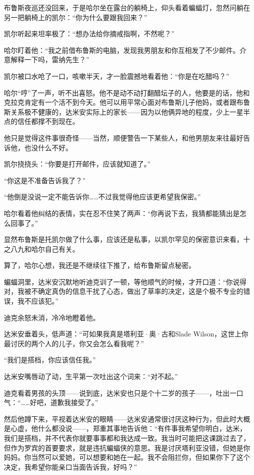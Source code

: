 \documentclass[../main]{subfiles}
\begin{document}
布鲁斯夜巡还没回来，于是哈尔坐在露台的躺椅上，仰头看着蝙蝠灯，忽然问躺在另一把躺椅上的凯尔：“你为什么要跟我回来？”

凯尔听起来坦率极了：“想办法给你摘戒指啊，不然呢？”

哈尔盯着他：“我之前借布鲁斯的电脑，发现我男朋友和你互相发了不少邮件。介意解释一下吗，雷纳先生？”

凯尔被口水呛了一口，咳嗽半天，才一脸震撼地看着他：“你是在吃醋吗？”

哈尔“哼”了一声，听不出喜怒。他不是动不动打翻醋坛子的人，他要是的话，他和克拉克肯定有一个活不到今天。他可以用平常心面对布鲁斯儿子他妈，或者跟布鲁斯关系极不健康的，达米安实际上的家长——因为以他俩异地的程度，少上一星半点的信任都撑不到现在。

他只是觉得这件事很奇怪——当然，顺便警告一下某些人，和他男朋友来往最好告诉他，也没什么不好。

凯尔挠挠头：“你要是打开邮件，应该就知道了。”

“你这是不准备告诉我了？”

“他倒是没说一定不能告诉你……不过我觉得他应该更希望我保密。”

哈尔看着他纠结的表情，实在忍不住笑了两声：“你再说下去，我猜都能猜出是怎么回事了。”

显然布鲁斯是托凯尔做了什么事，应该还是私事，以凯尔罕见的保密意识来看，十之八九和哈尔自己有关。

算了，哈尔心想，我还是不继续往下推了，给布鲁斯留点秘密。

蝙蝠洞里，达米安沉默地听迪克训了一顿，等他顺气的时候，才开口道：“你说得对，我被不确定真伪的信息干扰了心态，做出了草率的决定，这是个极不专业的错误，我不应该犯。”

迪克余怒未消，冷冷地瞪着他。

达米安垂着头，低声道：“可如果我真是塔利亚·奥·古和Slade
Wilson，这世上你最讨厌的两个人的儿子，你又会怎么看我呢？”

“我们是搭档，你应该信任我。”

达米安嘴唇动了动，生平第一次吐出这个词来：“对不起。”

迪克看着男孩的头顶——说到底，达米安也只是个十二岁的孩子——，吐出一口气：“……好吧，道歉我接受了。”

然后他蹲下来，平视着达米安的眼睛——达米安通常很讨厌这种行为，但此时大概是心虚，他什么都没说——，郑重其事地告诉他：“有件事我希望你明白，达米，我们是搭档，并不代表你就要事事都和我达成一致。我当时可能把这课跳过去了，但作为罗宾的首要要求，就是违抗蝙蝠侠的意思。我是讨厌塔利亚没错，但她是你妈妈。你当然可以爱她，可以想要和她在一起。我不会阻拦你，但如果你下了这个决定，我希望你能亲口当面告诉我，好吗？”
\end{document}
